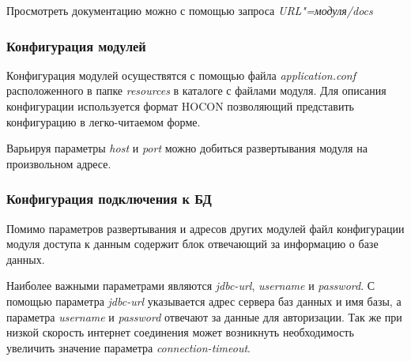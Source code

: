 Просмотреть документацию можно с помощью запроса \mbox{\emph{URL"=модуля/docs}}

\subsubsection{Конфигурация модулей}
Конфигурация модулей осуществятся с помощью файла \emph{application.conf} расположенного в папке \emph{resources} в каталоге с файлами модуля. Для описания конфигурации используется формат HOCON позволяющий представить конфигурацию в легко-читаемом форме. 



Варьируя параметры \emph{host} и \emph{port} можно добиться развертывания модуля на произвольном адресе.

\subsubsection{Конфигурация подключения к БД}
Помимо параметров развертывания и адресов других модулей файл конфигурации модуля доступа к данным содержит блок отвечающий за информацию о базе данных.



Наиболее важными параметрами являются \emph{jdbc-url}, \emph{username} и \emph{password}. С помощью параметра \emph{jdbc-url} указывается адрес сервера баз данных и имя базы, а параметра \emph{username} и \emph{password} отвечают за данные для авторизации. Так же при низкой скорость интернет соединения может возникнуть необходимость увеличить значение параметра \emph{connection-timeout}.